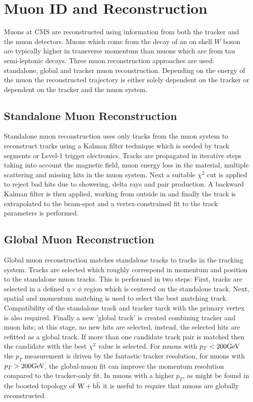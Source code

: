 \section{Muon ID and Reconstruction}
Muons at CMS are reconstructed using information from both the 
tracker and the muon detectors. Muons which come from the decay
of an on shell $W$ boson are typically higher in transverse momentum
than muons which are from tau semi-leptonic decays.
Three muon reconstruction approaches are used: standalone,
global and tracker muon reconstruction. Depending on the 
energy of the muon the reconstructed trajectory is either
solely dependent on the tracker or dependent on the tracker
and the muon system.
\subsection{Standalone Muon Reconstruction}
Standalone muon reconstruction uses only tracks from the muon system
to reconstruct tracks using a Kalman filter technique which is seeded
by track segments or Level-1 trigger electronics. Tracks are propagated
in iterative steps taking into account the magnetic field, muon energy loss in the material,
multiple scattering and missing hits in the muon system.
Next a suitable $\chi^{2}$ cut is applied to reject bad hits due to showering,
delta rays and pair production. A backward Kalman filter is then applied,
working from outside in and finally the track is extrapolated to the 
beam-spot and a vertex-constrained fit to the track
parameters is performed.
\subsection{Global Muon Reconstruction}
Global muon reconstruction matches standalone 
tracks to tracks in the tracking system. 
Tracks are selected which roughly correspond in momentum and position to 
the standalone muon tracks. This is performed in two steps: First,
tracks are selected in a defined $\eta\times\phi$ region which is centered
on the standalone track. Next, spatial and momentum matching is 
used to select the best matching track. Compatibility of the standalone track and tracker tarck with the
primary vertex is also required. Finally a new 'global track' is created combining
tracker and muon hits; at this stage, no new hits are selected, instead, 
the selected hits are refitted as a global track. If more than one candidate
track pair is matched then the candidate with the best $\chi^{2}$ value
is selected. 
For muons with $p_{T}<200\mathrm{GeV}$ the $p_{T}$ measurement is driven
by the fantastic tracker resolution, for muons with $p_{T}>200\mathrm{GeV}$,
the global-muon fit can improve the momentum resolution compared
to the tracker-only fit.
In muons with a higher $p_{T}$, as might be found
in the boosted topology of $\mathrm{W+\mathrm{b\bar{b}}}$ it is useful to require that muons
are globally reconstructed.
